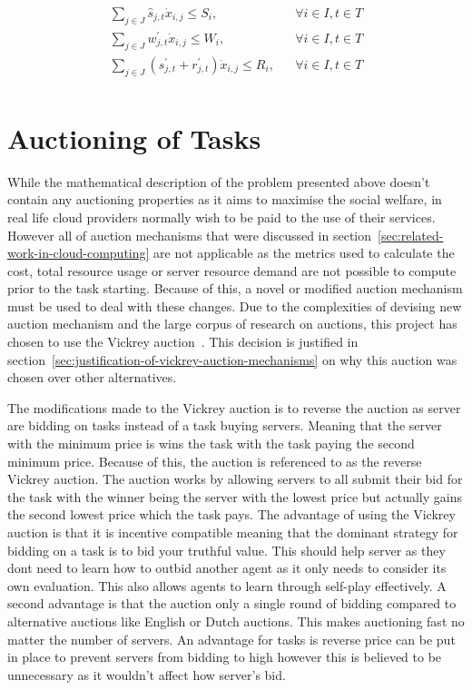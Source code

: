 \begin{align}
    \sum_{j \in J} \hat{s}_{j,t} \dot x_{i,j} \leq S_i, &&
        \forall{i \in I, t \in T} \label{eq:server_storage_capacity} \\
    \sum_{j \in J} w^{'}_{j,t} \dot x_{i,j} \leq W_i, &&
        \forall{i \in I, t \in T} \label{eq:server_computation_capacity} \\
    \sum_{j \in J} (s^{'}_{j,t} + r^{'}_{j,t}) \dot x_{i,j} \leq R_i, &&
        \forall{i \in I, t \in T} \label{eq:server_bandwidth_capacity} \\
\end{align}

\section{Auctioning of Tasks}\label{sec:auctioning-of-tasks}
While the mathematical description of the problem presented above doesn't contain any auctioning properties as it
aims to maximise the social welfare, in real life cloud providers normally wish to be paid to the use of their services.
However all of auction mechanisms that were discussed in section~\ref{sec:related-work-in-cloud-computing} are not
applicable as the metrics used to calculate the cost, total resource usage or server resource demand are not possible
to compute prior to the task starting. Because of this, a novel or modified auction mechanism must be used to deal with
these changes. Due to the complexities of devising new auction mechanism and the large corpus of research on auctions,
this project has chosen to use the Vickrey auction~\citep{vickrey}. This decision is justified in
section~\ref{sec:justification-of-vickrey-auction-mechanisms} on why this auction was chosen over other alternatives.

The modifications made to the Vickrey auction is to reverse the auction as server are bidding on tasks instead of
a task buying servers. Meaning that the server with the minimum price is wins the task with the task paying the
second minimum price. Because of this, the auction is referenced to as the reverse Vickrey auction. The auction works
by allowing servers to all submit their bid for the task with the winner being the server with the lowest
price but actually gains the second lowest price which the task pays. The advantage of using the Vickrey auction is
that it is incentive compatible meaning that the dominant strategy for bidding on a task is to bid your truthful value.
This should help server as they dont need to learn how to outbid another agent as it only needs to consider its own
evaluation. This also allows agents to learn through self-play effectively. A second advantage is that the auction only
a single round of bidding compared to alternative auctions like English or Dutch auctions. This makes auctioning fast
no matter the number of servers. An advantage for tasks is reverse price can be put in place to prevent servers from
bidding to high however this is believed to be unnecessary as it wouldn't affect how server's bid.

